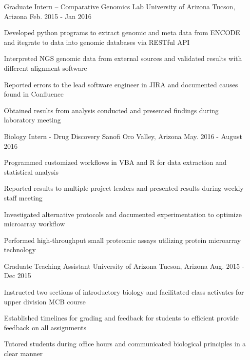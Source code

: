 \begin{cventries}
  \cventry
    {Graduate Intern – Comparative Genomics Lab} %
    {University of Arizona} %
    {Tucson, Arizona} %
    {Feb. 2015 - Jan 2016} %
    {
      \begin{cvitems} %
        \item{Developed python programs to extract genomic and meta data from ENCODE and itegrate to data into genomic databases via RESTful API}
        \item{Interpreted NGS genomic data from external sources and validated results with different alignment software}
        \item{Reported errors to the lead software engineer in JIRA and documented causes found in Confluence}
        \item{Obtained results from analysis conducted and presented findings during laboratory meeting}
      \end{cvitems}
    }

  \cventry
    {Biology Intern - Drug Discovery} %
    {Sanofi} %
    {Oro Valley, Arizona} %
    {May. 2016 - August 2016} %
    {
      \begin{cvitems} %
        \item{Programmed customized workflows in VBA and R for data extraction and statistical analysis}
        \item{Reported results to multiple project leaders and presented results during weekly staff meeting}
        \item{Investigated alternative protocols and documented experimentation to optimize microarray workflow}
        \item{Performed high-throughput small proteomic assays utilizing protein microarray technology}
      \end{cvitems}
    }

  \cventry
    {Graduate Teaching Assistant} %
    {University of Arizona} %
    {Tucson, Arizona} %
    {Aug. 2015 - Dec 2015} %
    {
      \begin{cvitems} %
        \item{Instructed two sections of introductory biology and facilitated class activates for upper division MCB course}
        \item{Established timelines for grading and feedback for students to efficient provide feedback on all assignments}
        \item{Tutored students during office hours and communicated biological principles in a clear manner}
      \end{cvitems}
    }


\end{cventries}

